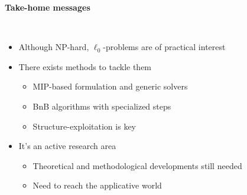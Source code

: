 \begin{frame}
    \begin{center}
        \Large{\textbf{Take-home messages}}
    \end{center}
    ~\\
    \begin{itemize}[label=\textbullet]
        \item Although \textcolor{TolLightOrange}{NP-hard}, $\ell_0$-problems are of \textcolor{TolLightOrange}{practical interest}
        \item There exists methods to tackle them
        \begin{itemize}[label=\textbullet]
        \item \textcolor{TolLightOrange}{MIP-based} formulation and generic solvers
        \item \textcolor{TolLightOrange}{BnB} algorithms with \textcolor{TolLightOrange}{specialized} steps
        \item \textcolor{TolLightOrange}{Structure-exploitation} is key
        \end{itemize}
        \item It's an active research area
        \begin{itemize}[label=\textbullet]
        \item Theoretical and methodological developments still needed
        \item Need to reach the applicative world
        \end{itemize}
    \end{itemize}
\end{frame}